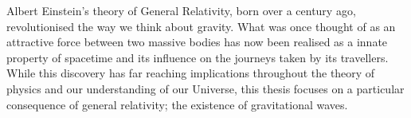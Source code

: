 Albert Einstein's theory of General Relativity, born over a century ago, revolutionised the way we think about gravity. What was once thought of as an attractive force between two massive bodies has now been realised as a innate property of spacetime and its influence on the journeys taken by its travellers. While this discovery has far reaching implications throughout the theory of physics and our understanding of our Universe, this thesis focuses on a particular consequence of general relativity; the existence of gravitational waves.








